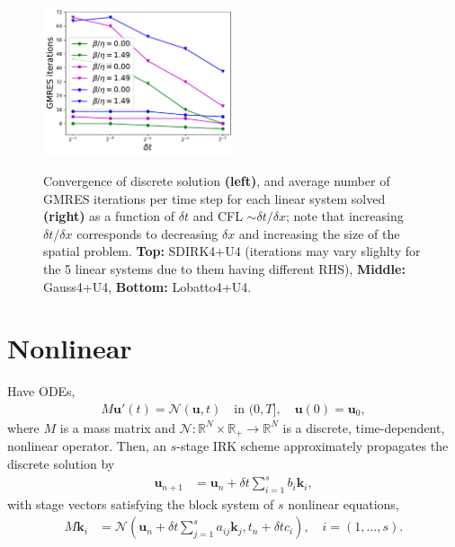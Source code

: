 \documentclass[review]{siamart}
\begin{document}
\begin{figure}[H]
{\quad
\includegraphics[width = 0.5\textwidth]{figures/solver_convergence/Lobatto4_gmres}
}
\caption{Convergence of discrete solution \textbf{(left)}, and average number of GMRES iterations per time step for each linear system solved \textbf{(right)} as a function of $\delta t$ and CFL $\sim \delta t / \delta x$; note that increasing $\delta t/\delta x$ corresponds to decreasing $\delta x$ and increasing the size of the spatial problem. \textbf{Top:} SDIRK4+U4 (iterations may vary slighlty for the 5 linear systems due to them having different RHS), \textbf{Middle:} Gauss4+U4, \textbf{Bottom:} Lobatto4+U4.
\label{fig:4th-order_solves}
}
\end{figure}



% 
% 


\newpage
\newpage
\section{Nonlinear}
Have ODEs,
%
\begin{align}
	M\mathbf{u}'(t) =  \mathcal{N}(\mathbf{u},t) \quad\text{in }(0,T], \quad \mathbf{u}(0) = \mathbf{u}_0,
\end{align}
%
where $M$ is a mass matrix and $\mathcal{N} \colon \mathbb{R}^{N} \times \mathbb{R}_+ \to \mathbb{R}^{N}$ is a discrete, time-dependent, nonlinear operator. Then, an $s$-stage IRK scheme approximately propagates the discrete  solution by
%
\begin{align}
\mathbf{u}_{n+1} & = \mathbf{u}_n + \delta t \sum_{i=1}^s b_i\mathbf{k}_i,
\end{align}
with stage vectors satisfying the block system of $s$ nonlinear equations,
\begin{align}
M\mathbf{k}_i & = \mathcal{N}\left(\mathbf{u}_n + \delta t\sum_{j=1}^s a_{ij}\mathbf{k}_j, t_n+\delta tc_i\right), \quad i = (1,\ldots,s).
\end{align}
\end{document}
